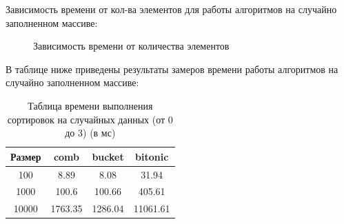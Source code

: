 \documentclass[12pt]{report}
\begin{document}
	Зависимость времени от кол-ва элементов для работы алгоритмов на случайно заполненном массиве:
	
	\begin{center}
		\begin{figure}[H]
		\center
		\caption{Зависимость времени от количества элементов}
		\end{figure}
	\end{center}
	
	В таблице ниже приведены результаты замеров времени работы алгоритмов на случайно заполненном массиве:
	
	\begin{table} [H]
		\caption{Таблица времени выполнения сортировок на случайных данных (от 0 до 3) (в мс)}
		\begin{center}
			\begin{tabular}{|c | c | c | c|}
				
				\hline
				
				Размер & comb & bucket & bitonic  \\ [0.5ex]
				
				\hline
				
				100 & 8.89 & 8.08 & 31.94 \\ 
				
				\hline 
				
				1000 & 100.6 & 100.66 & 405.61 \\ 
				
				\hline 
				
				10000 & 1763.35 & 1286.04 & 11061.61 \\ 
				
				\hline 
				
			\end{tabular}
		\end{center}
	\end{table}
	
\end{document}
